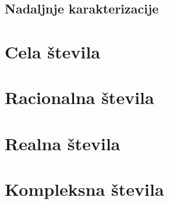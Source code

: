 
\subsection{Nadaljnje karakterizacije}


\section{Cela števila}
\section{Racionalna števila}
\section{Realna števila}
\section{Kompleksna števila}




